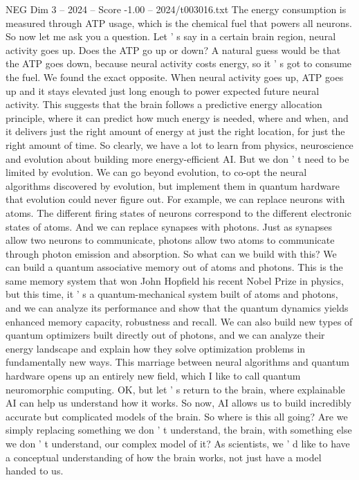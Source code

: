 \begin{textsample}{NEG Dim 3 – 2024 – Score -1.00 – 2024/t003016.txt}
The energy consumption is measured through ATP usage, which is the chemical fuel that powers all neurons.
So now let me ask you a question.
Let ' s say in a certain brain region, neural activity goes up.
Does the ATP go up or down?
A natural guess would be that the ATP goes down, because neural activity costs energy, so it ' s got to consume the fuel.
We found the exact opposite.
When neural activity goes up, ATP goes up and it stays elevated just long enough to power expected future neural activity.
This suggests that the brain follows a predictive energy allocation principle, where it can predict how much energy is needed, where and when, and it delivers just the right amount of energy at just the right location, for just the right amount of time.
So clearly, we have a lot to learn from physics, neuroscience and evolution about building more energy-efficient AI.
But we don ' t need to be limited by evolution.
We can go beyond evolution, to co-opt the neural algorithms discovered by evolution, but implement them in quantum hardware that evolution could never figure out.
For example, we can replace neurons with atoms.
The different firing states of neurons correspond to the different electronic states of atoms.
And we can replace synapses with photons.
Just as synapses allow two neurons to communicate, photons allow two atoms to communicate through photon emission and absorption.
So what can we build with this?
We can build a quantum associative memory out of atoms and photons.
This is the same memory system that won John Hopfield his recent Nobel Prize in physics, but this time, it ' s a quantum-mechanical system built of atoms and photons, and we can analyze its performance and show that the quantum dynamics yields enhanced memory capacity, robustness and recall.
We can also build new types of quantum optimizers built directly out of photons, and we can analyze their energy landscape and explain how they solve optimization problems in fundamentally new ways.
This marriage between neural algorithms and quantum hardware opens up an entirely new field, which I like to call quantum neuromorphic computing.
OK, but let ' s return to the brain, where explainable AI can help us understand how it works.
So now, AI allows us to build incredibly accurate but complicated models of the brain.
So where is this all going?
Are we simply replacing something we don ' t understand, the brain, with something else we don ' t understand, our complex model of it?
As scientists, we ' d like to have a conceptual understanding of how the brain works, not just have a model handed to us.

\end{textsample}
